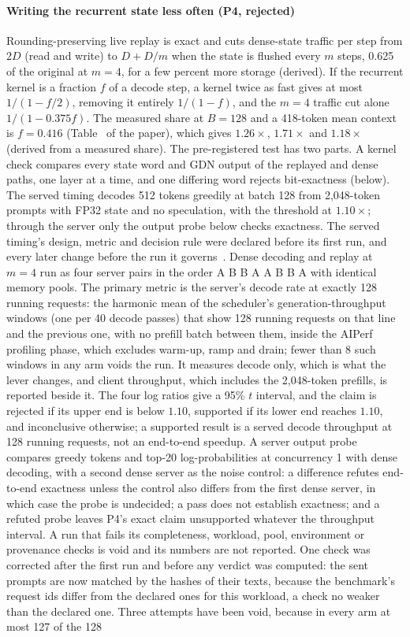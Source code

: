 \paragraph{Writing the recurrent state less often (P4, rejected)} Rounding-preserving live replay is exact and cuts dense-state traffic per step from $2D$ (read and write) to $D+D/m$ when the state is flushed every $m$ steps, 0.625 of the original at $m=4$, for a few percent more storage (derived). If the recurrent kernel is a fraction $f$ of a decode step, a kernel twice as fast gives at most $1/(1-f/2)$, removing it entirely $1/(1-f)$, and the $m=4$ traffic cut alone $1/(1-0.375f)$. The measured share at $B=128$ and a 418-token mean context is $f=0.416$ (Table~ of the paper), which gives $1.26\times$, $1.71\times$ and $1.18\times$ (derived from a measured share). The pre-registered test has two parts. A kernel check compares every state word and GDN output of the replayed and dense paths, one layer at a time, and one differing word rejects bit-exactness (below). The served timing decodes 512 tokens greedily at batch 128 from 2,048-token prompts with FP32 state and no speculation, with the threshold at $1.10\times$; through the server only the output probe below checks exactness. The served timing's design, metric and decision rule were declared before its first run, and every later change before the run it governs~. Dense decoding and replay at $m=4$ run as four server pairs in the order A B B A A B B A with identical memory pools. The primary metric is the server's decode rate at exactly 128 running requests: the harmonic mean of the scheduler's generation-throughput windows (one per 40 decode passes) that show 128 running requests on that line and the previous one, with no prefill batch between them, inside the AIPerf profiling phase, which excludes warm-up, ramp and drain; fewer than 8 such windows in any arm voids the run. It measures decode only, which is what the lever changes, and client throughput, which includes the 2,048-token prefills, is reported beside it. The four log ratios give a 95\% $t$ interval, and the claim is rejected if its upper end is below $1.10$, supported if its lower end reaches $1.10$, and inconclusive otherwise; a supported result is a served decode throughput at 128 running requests, not an end-to-end speedup. A server output probe compares greedy tokens and top-20 log-probabilities at concurrency 1 with dense decoding, with a second dense server as the noise control: a difference refutes end-to-end exactness unless the control also differs from the first dense server, in which case the probe is undecided; a pass does not establish exactness; and a refuted probe leaves P4's exact claim unsupported whatever the throughput interval. A run that fails its completeness, workload, pool, environment or provenance checks is void and its numbers are not reported. One check was corrected after the first run and before any verdict was computed: the sent prompts are now matched by the hashes of their texts, because the benchmark's request ids differ from the declared ones for this workload, a check no weaker than the declared one. Three attempts have been void, because in every arm at most 127 of the 128 